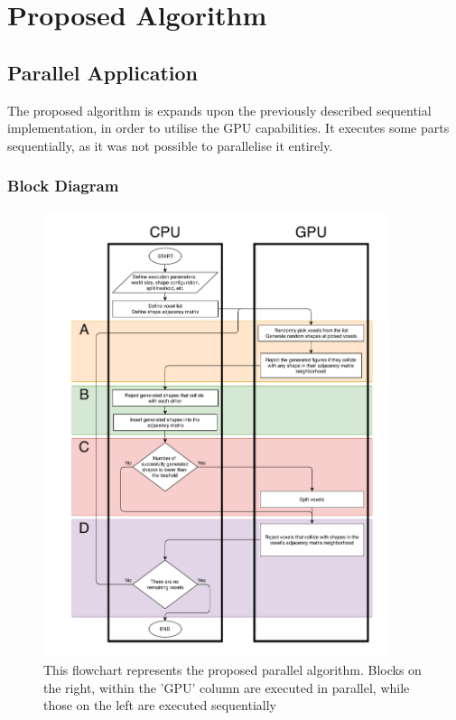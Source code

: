 \documentclass[12pt, oneside]{report}
\begin{document}
\chapter{Proposed Algorithm}

\section {Parallel Application}
The proposed algorithm is expands upon the previously described sequential implementation, in order to utilise the GPU capabilities. It executes some parts sequentially, as it was not possible to parallelise it entirely.

\subsection{Block Diagram}

\begin{figure}[H]
  \centering
	\includegraphics[width=0.9\textwidth,height=0.9\textheight,keepaspectratio]{Images/GPURSA/GPUDiagram1.pdf}
	\caption{This flowchart represents the proposed parallel algorithm. \newline
		Blocks on the right, within the 'GPU' column are executed in parallel, while those on the left are executed sequentially}
	\label{GPURSABlockDiagramPdf}
\end{figure}
\end{document}
